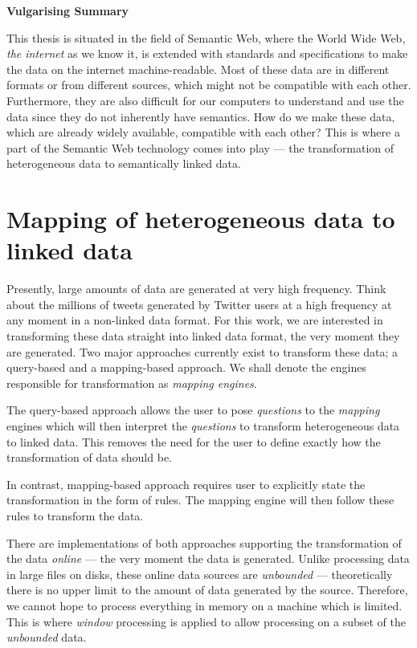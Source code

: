 \newpage
{}
{}
\noindent \textbf{\huge Vulgarising Summary }

\vspace{1.5cm}
This thesis is situated in the field of Semantic Web, where the 
World Wide Web, \emph{the internet} as we know it, is extended 
with standards and specifications to make the data on 
the internet machine-readable. Most of these data are in different 
formats or from different sources,
which might not be compatible with each other. Furthermore, 
they are also difficult for our computers to understand and use the 
data since they do not inherently have semantics.  
How do we make these data, which are already widely available, 
compatible with each other? This is where a part of 
the Semantic Web technology comes into play --- the 
transformation of heterogeneous data to semantically linked data. 


\section*{Mapping of heterogeneous data to linked data}

Presently, large amounts of data are generated at very high frequency. 
Think about the millions of tweets generated by Twitter users at a high 
frequency at any moment in a non-linked data format. For this work, we 
are interested in transforming these data straight into linked data format, 
the very moment they are generated. Two major approaches currently exist 
to transform these data; a query-based and a mapping-based approach. We shall denote 
the engines responsible for transformation as \emph{mapping engines}.  

The query-based approach allows the user to pose \emph{questions} 
to the \emph{mapping}
engines which will then interpret the \emph{questions} to transform 
heterogeneous data to linked data. This removes the need for the user 
to define exactly how the transformation of data should be. 

In contrast, mapping-based approach requires user to explicitly 
state the transformation in the form of rules. 
The mapping engine will then follow these rules to transform the data. 

There are implementations of both approaches supporting 
the transformation of the data \emph{online} --- the very moment 
the data is generated. Unlike processing data in large files on disks, 
these online data sources are \emph{unbounded} --- theoretically there is no 
upper limit to the amount of data generated by the source. Therefore, 
we cannot hope to process everything in memory on a machine which is limited.
This is where \emph{window} processing is applied to allow processing on a 
subset of the \emph{unbounded} data. 


